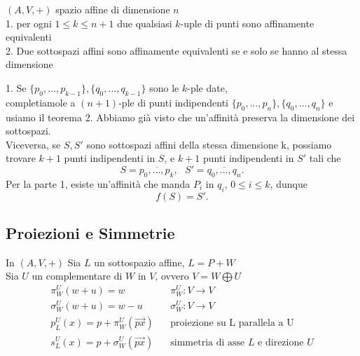 \documentclass[12px]{article}
\begin{document}
\begin{coro}
	$(A,V,+)$ spazio affine di dimensione $n$\\
	1. per ogni $1\leq k\leq n + 1$ due qualsiasi $k$-uple di punti sono affinamente equivalenti\\
	2. Due sottospazi affini sono affinamente equivalenti se e solo se hanno al stessa dimensione
\end{coro}
\begin{dimo}
	1. Se $\{p_0,\ldots,p_{k-1}\}, \{q_0,\ldots,q_{k - 1}\}$ sono le $k$-ple date,\\ completiamole a $(n+1)$-ple di punti indipendenti $\{p_0,\ldots,p_n\}, \{q_0,\ldots,q_n\}$ e usiamo il teorema
	2. Abbiamo già visto che un'affinità preserva la dimensione dei sottospazi.\\
	Viceversa, se $S,S'$ sono sottospazi affini della stessa dimensione k, possiamo trovare $k+1$ punti indipendenti in $S$, e $k+1$ punti indipendenti in $S'$ tali che \[
	S = \overline{p_0,\ldots,p_k}, \ \ \ S'=\overline{q_0,\ldots,q_n}
	.\] 
	Per la parte 1, esiste un'affinità che manda $P_i$ in $q_i$, $0\leq i \leq k$, dunque \[
	f(S) = S'
	.\]
\end{dimo}
\newpage
\subsection{Proiezioni e Simmetrie}
\begin{defi}
In $(A,V,+)$ Sia $L$ un sottospazio affine, $L = P+W$\\
Sia $U$ un complementare di $W$ in $V$, ovvero  $V = W\bigoplus U$
\begin{align*}
	\pi_W^U(w+u)=w \ \ \ \ \ \ \ \ \ \ \ & \pi_W^U:V \rightarrow V\\
	\sigma_W^U(w+u) = w - u \ \ \ \ \ & \sigma_W^U:V \rightarrow V \\
	p_L^U(x) = p+\pi_W^U(\overrightarrow{px}) \ \ \ \ &\text{proiezione su L parallela a U}\\
	s_L^U(x) = p+\sigma_W^U(\overrightarrow{px}) \ \ \ \ &\text{simmetria di asse $L$ e direzione $U$}
\end{align*}
\end{defi}
\end{document}

